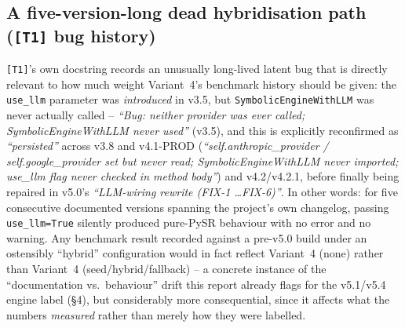 \documentclass[11pt,a4paper]{article}
\newcommand{\code}[1]{\texttt{\small #1}}
\begin{document}
\subsection{A five-version-long dead hybridisation path (\code{[T1]} bug history)}
\code{[T1]}'s own docstring records an unusually long-lived latent bug that
is directly relevant to how much weight Variant~4's benchmark history
should be given: the \code{use\_llm} parameter was \emph{introduced} in
v3.5, but \code{SymbolicEngineWithLLM} was never actually called --
\emph{``Bug: neither provider was ever called; SymbolicEngineWithLLM never
used''} (v3.5), and this is explicitly reconfirmed as \emph{``persisted''}
across v3.8 and v4.1-PROD (\emph{``self.anthropic\_provider /
self.google\_provider set but never read; SymbolicEngineWithLLM never
imported; use\_llm flag never checked in method body''}) and v4.2/v4.2.1,
before finally being repaired in v5.0's \emph{``LLM-wiring rewrite (FIX-1
\ldots FIX-6)''}. In other words: for five consecutive documented versions
spanning the project's own changelog, passing \code{use\_llm=True} silently
produced pure-PySR behaviour with no error and no warning. Any benchmark
result recorded against a pre-v5.0 build under an ostensibly ``hybrid''
configuration would in fact reflect Variant~4 (none) rather than Variant~4
(seed/hybrid/fallback) -- a concrete instance of the ``documentation vs.\
behaviour'' drift this report already flags for the v5.1/v5.4 engine label
(\S4), but considerably more consequential, since it affects what the
numbers \emph{measured} rather than merely how they were labelled.
\end{document}
